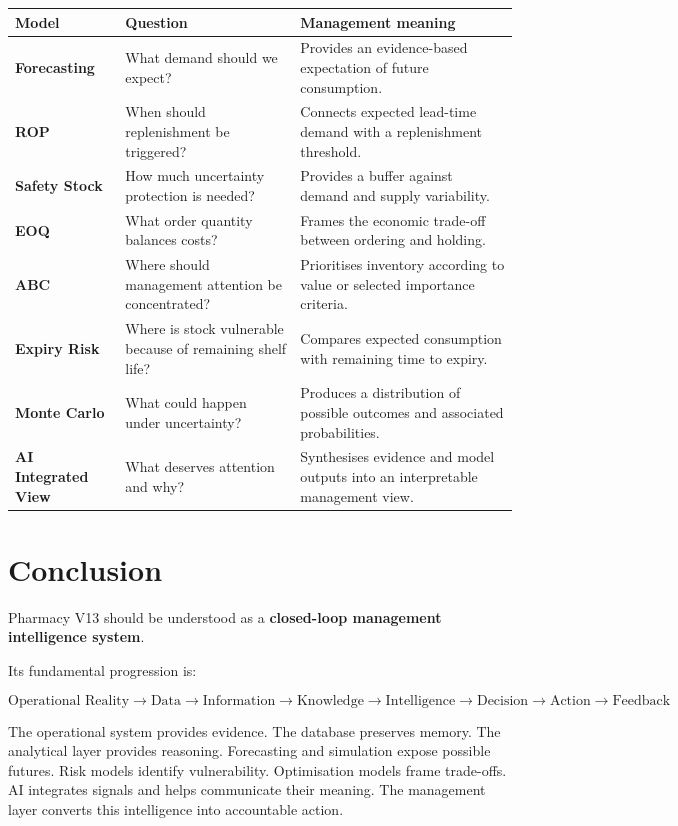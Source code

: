 \documentclass[11pt,a4paper]{article}
\begin{document}
\begin{center}
\renewcommand{\arraystretch}{1.5}
\begin{longtable}{>{\bfseries}p{33mm} p{45mm} p{62mm}}
\toprule
Model & Question & Management meaning \\
\midrule
Forecasting &
What demand should we expect? &
Provides an evidence-based expectation of future consumption. \\
ROP &
When should replenishment be triggered? &
Connects expected lead-time demand with a replenishment threshold. \\
Safety Stock &
How much uncertainty protection is needed? &
Provides a buffer against demand and supply variability. \\
EOQ &
What order quantity balances costs? &
Frames the economic trade-off between ordering and holding. \\
ABC &
Where should management attention be concentrated? &
Prioritises inventory according to value or selected importance criteria. \\
Expiry Risk &
Where is stock vulnerable because of remaining shelf life? &
Compares expected consumption with remaining time to expiry. \\
Monte Carlo &
What could happen under uncertainty? &
Produces a distribution of possible outcomes and associated probabilities. \\
AI Integrated View &
What deserves attention and why? &
Synthesises evidence and model outputs into an interpretable management view. \\
\bottomrule
\end{longtable}
\end{center}

\section{Conclusion}

Pharmacy V13 should be understood as a \textbf{closed-loop management
intelligence system}.

Its fundamental progression is:

\[
\boxed{
\text{Operational Reality}
\rightarrow
\text{Data}
\rightarrow
\text{Information}
\rightarrow
\text{Knowledge}
\rightarrow
\text{Intelligence}
\rightarrow
\text{Decision}
\rightarrow
\text{Action}
\rightarrow
\text{Feedback}
}
\]

The operational system provides evidence. The database preserves memory. The
analytical layer provides reasoning. Forecasting and simulation expose possible
futures. Risk models identify vulnerability. Optimisation models frame
trade-offs. AI integrates signals and helps communicate their meaning. The
management layer converts this intelligence into accountable action.
\end{document}
